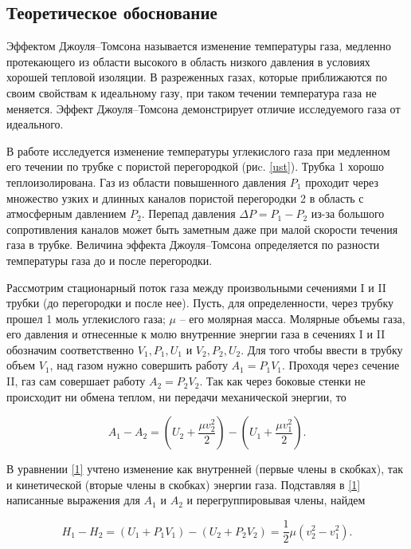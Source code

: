 \documentclass[12pt]{article}
\begin{document}
\subsection*{Теоретическое обоснование}
Эффектом Джоуля–Томсона называется изменение температуры газа, медленно протекающего из области высокого в область низкого давления в условиях хорошей тепловой изоляции. В разреженных газах, которые приближаются по своим свойствам к идеальному газу, при таком течении температура газа не меняется. Эффект Джоуля–Томсона демонстрирует отличие исследуемого газа от идеального.

В работе исследуется изменение температуры углекислого газа при медленном его течении по трубке с пористой перегородкой (риc. \ref{ust}). Трубка 1 хорошо теплоизолирована. Газ из области повышенного давления $ P_1 $ проходит через множество узких и длинных каналов пористой перегородки 2 в область с атмосферным давлением $ P_2 $. Перепад давления $ \Delta P = P_1 - P_2 $ из-за большого сопротивления каналов может быть заметным даже при малой скорости течения газа в трубке. Величина эффекта Джоуля–Томсона определяется по разности температуры газа до и после перегородки.

Рассмотрим стационарный поток газа между произвольными сечениями I и II трубки (до перегородки и после нее). Пусть, для определенности, через трубку прошел 1 моль углекислого газа; $ \mu $ -- его молярная масса. Молярные объемы газа, его давления и отнесенные к молю внутренние энергии газа в сечениях I и II обозначим соответственно $ V_1, P_1, U_1 $ и $ V_2, P_2, U_2 $. Для того чтобы ввести в трубку объем $ V_1 $, над газом нужно совершить работу $ A_1 = P_1V_1 $. Проходя через сечение II, газ сам совершает работу $ A_2 = P_2V_2 $. Так как через боковые стенки не происходит ни обмена теплом, ни передачи механической энергии, то

\begin{equation}\label{1}
    A_1-A_2=\left(U_2+\frac{\mu v_2^2}{2}\right) - \left(U_1 + \frac{\mu v_1^2}{2}\right).
\end{equation}

В уравнении \ref{1} учтено изменение как внутренней (первые члены в скобках), так и кинетической (вторые члены в скобках) энергии газа. Подставляя в \ref{1} написанные выражения для $ A_1 $ и $ A_2 $ и перегруппировывая члены, найдем

\begin{equation}\label{2}
    H_1-H_2=\left(U_1+P_1V_1\right) - \left(U_2 + P_2V_2\right) = \frac{1}{2} \mu \left(v^2_2-v^2_1\right).
\end{equation}
\end{document}
